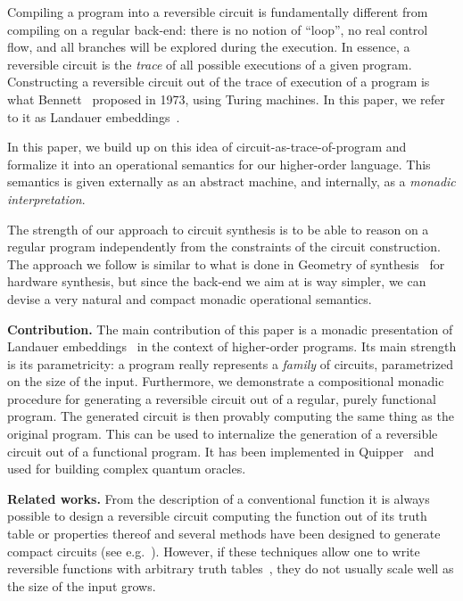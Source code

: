 \documentclass{article}
\theoremstyle{plain}
\theoremstyle{definition}
\begin{document}
Compiling a program into a reversible circuit is fundamentally
different from compiling on a regular back-end: there is no notion of
``loop'', no real control flow, and all branches will be explored
during the execution.  In essence, a reversible circuit is the {\em
  trace} of all possible executions of a given program. Constructing a
reversible circuit out of the trace of execution of a program is what
Bennett~\cite{bennett73logical} proposed in 1973, using Turing
machines. In this paper, we refer to it as Landauer
embeddings~\cite{landauer61irreversibility}.

In this paper, we build up on this idea of circuit-as-trace-of-program
and formalize it into an operational semantics for our higher-order
language. This semantics is given externally as an abstract machine,
and internally, as a {\em monadic interpretation}.

The strength of our approach to circuit synthesis is to be able to
reason on a regular program independently from the constraints of the
circuit construction. The approach we follow is similar to what is
done in Geometry of synthesis~\cite{ghica07gos} for hardware synthesis, but
since the back-end we aim at is way simpler, we can devise a very
natural and compact monadic operational semantics.

\smallskip
\noindent
{\bf Contribution.}
The main contribution of this paper is a monadic presentation of
Landauer embeddings~\cite{landauer61irreversibility} in the context of
higher-order programs. Its main strength is its parametricity: a
program really represents a {\em family} of circuits, parametrized on
the size of the input. Furthermore, we demonstrate a compositional
monadic procedure for generating a reversible circuit out of a
regular, purely functional program. The generated circuit is then
provably computing the same thing as the original program. This can be
used to internalize the generation of a reversible circuit out of a
functional program. It has been implemented in Quipper~\cite{Quipper}
and used for building complex quantum oracles.


\smallskip
\noindent
{\bf Related works.}
From the description of a conventional function it is always possible
to design a reversible circuit computing the function out of its
truth table or properties thereof and several methods have been
designed to generate compact
circuits (see e.g.~\cite{rev-survey-2011,maslov-templates-iccad03,synth4,synth13,synth2,synth17}).
However, if these techniques allow one to write
reversible functions with arbitrary truth tables~\cite{revlib}, they
do not usually scale well as the size of the input grows.
\end{document}
